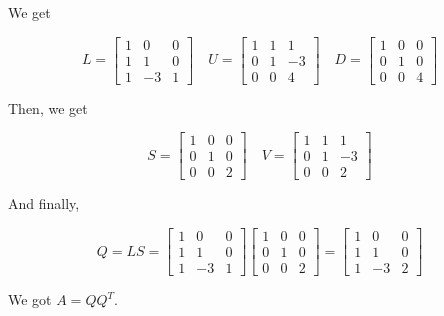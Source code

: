 We get 

\[
    L = 
    \begin{bmatrix}
       1 & 0 & 0 \\ 
       1 & 1 & 0 \\ 
       1 & -3 & 1 
    \end{bmatrix}
    \quad 
    U = 
    \begin{bmatrix}
       1 & 1 & 1 \\ 
       0 & 1 & -3 \\ 
       0 & 0 & 4 
    \end{bmatrix}
    \quad 
    D = 
    \begin{bmatrix}
       1 & 0 & 0 \\ 
       0 & 1 & 0 \\ 
       0 & 0 & 4 
    \end{bmatrix}
\]

Then, we get 

\[
    S = 
    \begin{bmatrix}
       1 & 0 & 0 \\ 
       0 & 1 & 0 \\ 
       0 & 0 & 2 
    \end{bmatrix}
    \quad 
    V = 
    \begin{bmatrix}
       1 & 1 & 1 \\ 
       0 & 1 & -3 \\ 
       0 & 0 & 2 
    \end{bmatrix}
\]

And finally, 

\[
    Q = LS = 
     \begin{bmatrix}
       1 & 0 & 0 \\ 
       1 & 1 & 0 \\ 
       1 & -3 & 1 
    \end{bmatrix} 
    \begin{bmatrix}
       1 & 0 & 0 \\ 
       0 & 1 & 0 \\ 
       0 & 0 & 2 
    \end{bmatrix}
    = 
    \begin{bmatrix}
       1 & 0 & 0 \\ 
       1 & 1 & 0 \\ 
       1 & -3 & 2 
    \end{bmatrix}
\]

We got \(A = Q Q^T\).
